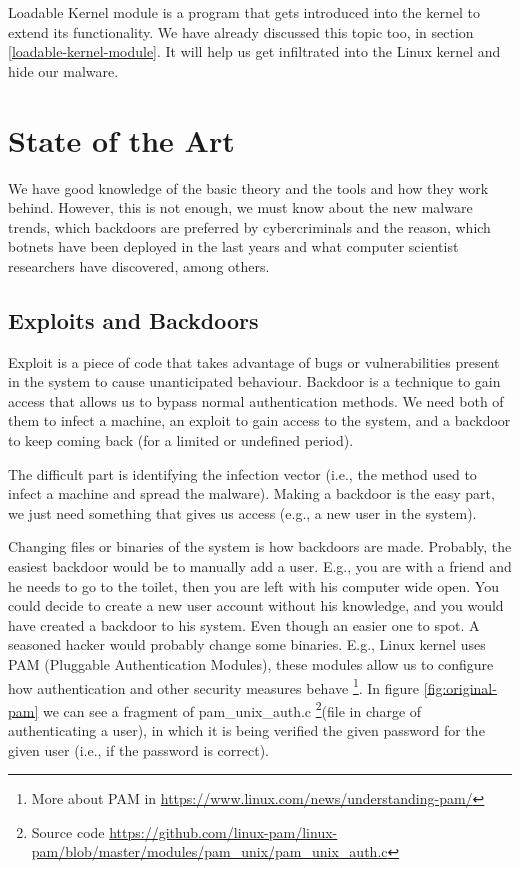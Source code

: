 \documentclass[11pt, a4paper,twoside]{tesi_upf}
\begin{document}
Loadable Kernel module is a program that gets introduced into the kernel to extend its functionality. We have already discussed this topic too, in section \ref{loadable-kernel-module}. It will help us get infiltrated into the Linux kernel and hide our malware.

\chapter{State of the Art}

We have good knowledge of the basic theory and the tools and how they work behind. However, this is not enough, we must know about the new malware trends, which backdoors are preferred by cybercriminals and the reason, which botnets have been deployed in the last years and what computer scientist researchers have discovered, among others.

\section{Exploits and Backdoors} \label{section:exploits-and-backdoor}

Exploit is a piece of code that takes advantage of bugs or vulnerabilities present in the system to cause unanticipated behaviour. Backdoor is a technique to gain access that allows us to bypass normal authentication methods. We need both of them to infect a machine, an exploit to gain access to the system, and a backdoor to keep coming back (for a limited or undefined period).

The difficult part is identifying the infection vector (i.e., the method used to infect a machine and spread the malware). Making a backdoor is the easy part, we just need something that gives us access (e.g., a new user in the system). 

Changing files or binaries of the system is how backdoors are made. Probably, the easiest backdoor would be to manually add a user. E.g., you are with a friend and he needs to go to the toilet, then you are left with his computer wide open. You could decide to create a new user account without his knowledge, and you would have created a backdoor to his system. Even though an easier one to spot. 
A seasoned hacker would probably change some binaries. E.g., Linux kernel uses PAM (Pluggable Authentication Modules), these modules allow us to configure how authentication and other security measures behave \footnote{More about PAM in \url{https://www.linux.com/news/understanding-pam/}}. In figure \ref{fig:original-pam} we can see a fragment of pam\_unix\_auth.c \footnote{Source code \url{https://github.com/linux-pam/linux-pam/blob/master/modules/pam_unix/pam_unix_auth.c}}(file in charge of authenticating a user), in which it is being verified the given password for the given user (i.e., if the password is correct).
\end{document}
